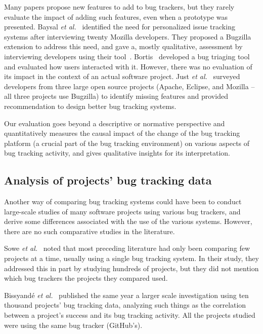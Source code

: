 Many papers propose new features to add to bug trackers, but they rarely evaluate the impact of adding such features, even when a prototype was presented.
Baysal \emph{et al.}~\cite{baysal2013situational} identified the need for personalized issue tracking systems after interviewing twenty Mozilla developers.
They proposed a Bugzilla extension to address this need, and gave a, mostly qualitative, assessment by interviewing developers using their tool~\cite{baysal2014no}.
Bortis~\cite{bortis2016porchlight} developed a bug triaging tool and evaluated how users interacted with it. However, there was no evaluation of its impact in the context of an actual software project.
Just \emph{et al.}~\cite{just2008towards} surveyed developers from three large open source projects (Apache, Eclipse, and Mozilla --all three projects use Bugzilla) to identify missing features and provided recommendation to design better bug tracking systems.

Our evaluation goes beyond a descriptive or normative perspective and quantitatively measures the causal impact of the change of the bug tracking platform (a crucial part of the bug tracking environment) on various aspects of bug tracking activity, and gives qualitative insights for its interpretation.

\subsection{Analysis of projects' bug tracking data}

Another way of comparing bug tracking systems could have been to conduct large-scale studies of many software projects using various bug trackers, and derive some differences associated with the use of the various systems. However, there are no such comparative studies in the literature.

Sowe \emph{et al.}~\cite{sowe2013multi} noted that most preceding literature had only been comparing few projects at a time, usually using a single bug tracking system.
In their study, they addressed this in part by studying hundreds of projects, but they did not mention which bug trackers the projects they compared used.

Bissyand\'e \emph{et al.}~\cite{bissyande2013got} published the same year a larger scale investigation using ten thousand projects' bug tracking data, analyzing such things as the correlation between a project's success and its bug tracking activity.
All the projects studied were using the same bug tracker (GitHub's).

